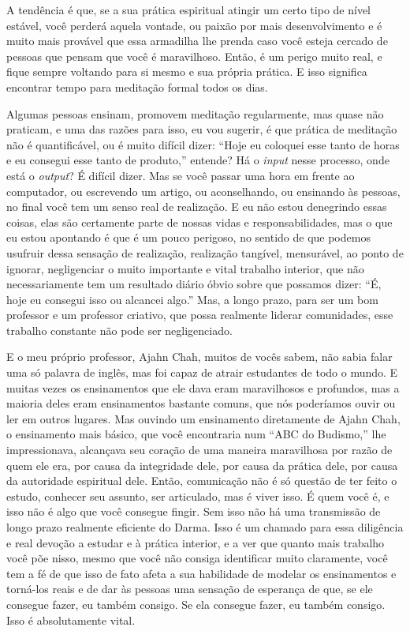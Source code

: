 A tendência é que, se a sua prática espiritual atingir um certo tipo
de nível estável, você perderá aquela vontade, ou paixão por mais
desenvolvimento e é muito mais provável que essa armadilha lhe prenda
caso você esteja cercado de pessoas que pensam que você é maravilhoso.
Então, é um perigo muito real, e fique sempre voltando para si mesmo e
sua própria prática. E isso significa encontrar tempo para meditação
formal todos os dias. 

Algumas pessoas ensinam, promovem meditação regularmente, mas quase
não praticam, e uma das razões para isso, eu vou sugerir, é que prática
de meditação não é quantificável, ou é muito difícil dizer: “Hoje eu
coloquei esse tanto de horas e eu consegui esse tanto de produto,”
entende? Há o \emph{input} nesse processo, onde está o
\emph{output}? É difícil dizer. Mas se você passar uma hora em frente
ao computador, ou escrevendo um artigo, ou aconselhando, ou ensinando
às pessoas, no final você tem um senso real de realização. E eu não
estou denegrindo essas coisas, elas são certamente parte de nossas
vidas e responsabilidades, mas o que eu estou apontando é que é um
pouco perigoso, no sentido de que podemos usufruir dessa sensação de
realização, realização tangível, mensurável, ao ponto de ignorar,
negligenciar o muito importante e vital trabalho interior, que não
necessariamente tem um resultado diário óbvio sobre que possamos dizer:
“É, hoje eu consegui isso ou alcancei algo.” Mas, a longo prazo, para
ser um bom professor e um professor criativo, que possa realmente
liderar comunidades, esse trabalho constante não pode ser
negligenciado. 

E o meu próprio professor, Ajahn Chah, muitos de vocês sabem, não
sabia falar uma só palavra de inglês, mas foi capaz de atrair
estudantes de todo o mundo. E muitas vezes os ensinamentos que ele dava
eram maravilhosos e profundos, mas a maioria deles eram ensinamentos
bastante comuns, que nós poderíamos ouvir ou ler em outros lugares. Mas
ouvindo um ensinamento diretamente de Ajahn Chah, o ensinamento mais
básico, que você encontraria num “\textsc{ABC} do Budismo,” lhe impressionava,
alcançava seu coração de uma maneira maravilhosa por razão de quem ele
era, por causa da integridade dele, por causa da prática dele, por
causa da autoridade espiritual dele. Então, comunicação não é só
questão de ter feito o estudo, conhecer seu assunto, ser articulado,
mas é viver isso. É quem você é, e isso não é algo que você consegue
fingir. Sem isso não há uma transmissão de longo prazo realmente
eficiente do Darma. Isso é um chamado para essa diligência e real
devoção a estudar e à prática interior, e a ver que quanto mais
trabalho você põe nisso, mesmo que você não consiga identificar muito
claramente, você tem a fé de que isso de fato afeta a sua habilidade de
modelar os ensinamentos e torná-los reais e de dar às pessoas uma
sensação de esperança de que, se ele consegue fazer, eu também consigo.
Se ela consegue fazer, eu também consigo. Isso é absolutamente vital. 


